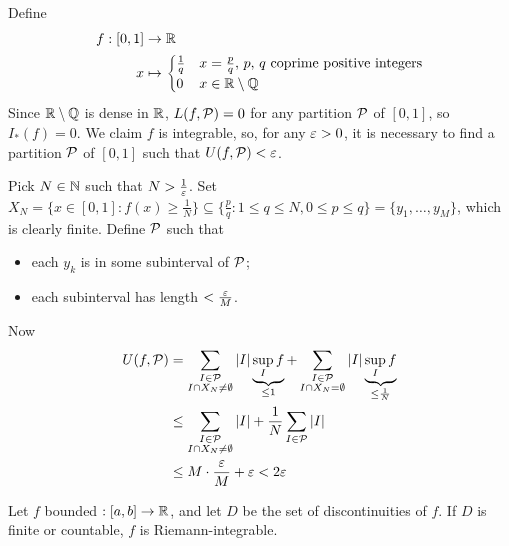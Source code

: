 \documentclass{../template/note}
\begin{document}
    \begin{example*}
        Define
        \begin{align*}
            f: [0, 1] &\to \mathbb R \\
            x &\mapsto \begin{cases}
                \frac 1 q & x = \frac p q,\, p,\, q \text{ coprime positive integers} \\
                0 & x \in \mathbb R \setminus \mathbb Q
            \end{cases}
        \end{align*}
        Since \(\mathbb R \setminus \mathbb Q\) is dense in \(\mathbb R\), \(L(f, \mathcal{P}) = 0\) for any partition \(\mathcal{P}\) of \([0, 1]\), so \(I_*(f) = 0\). We claim \(f\) is integrable, so, for any \(\varepsilon > 0\), it is necessary to find a partition \(\mathcal{P}\) of \([0, 1]\) such that \(U(f, \mathcal{P}) < \varepsilon\).

        Pick \(N \in \mathbb N\) such that \(N > \frac 1 {\varepsilon}\). Set \(X_N = \{x \in [0, 1]: f(x) \geq \frac 1 N\} \subseteq \{\frac p q: 1 \leq q \leq N, 0 \leq p \leq q\} = \{y_1, \dots, y_M\}\), which is clearly finite. Define \(\mathcal{P}\) such that
        \begin{itemize}
            \item each \(y_k\) is in some subinterval of \(\mathcal{P}\);
            \item each subinterval has length \(< \frac{\varepsilon} M\).
        \end{itemize}
        Now
        \begin{align*}
            U(f, \mathcal{P}) &= \sum_{\substack{I \in \mathcal{P} \\ I \cap X_N \neq \emptyset}} |I| \underbrace{\sup_I f}_{\leq 1} + \sum_{\substack{I \in \mathcal{P} \\ I \cap X_N = \emptyset}} |I| \underbrace{\sup_I f}_{\leq \frac 1 N} \\ 
            &\leq \sum_{\substack{I \in \mathcal{P} \\ I \cap X_N \neq \emptyset}} |I| + \frac 1 N \sum_{I \in \mathcal{P}} |I| \\
            &\leq M \cdot \frac{\varepsilon} M + \varepsilon < 2\varepsilon
        \end{align*}
    \end{example*}
    
    \begin{proposition}
        Let \(f\) bounded \(: [a, b] \to \mathbb R\), and let \(D\) be the set of discontinuities of \(f\). If \(D\) is finite or countable, \(f\) is Riemann-integrable.
    \end{proposition}
    
\end{document}
